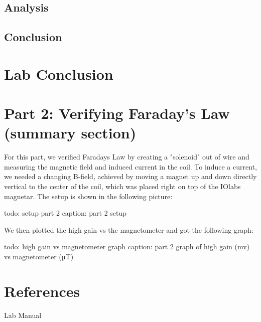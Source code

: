 \documentclass[11pt]{article}
\let\oldsection\section
\renewcommand\section{\clearpage\oldsection}
\begin{document}
    \subsection{Analysis}\label{subsec:part_3_analsysis}
    \subsection{Conclusion}\label{subsec:part_3_conclusion}

    \section{Lab Conclusion}\label{sec:lab_conclusion}


    

    \section{Part 2: Verifying Faraday’s Law (summary section)}\label{sec:part_2}

    For this part, we verified Faradays Law by creating a "solenoid" out of wire and measuring the magnetic field and induced current in the coil. To induce a current, we needed a changing B-field, achieved by moving a magnet up and down directly vertical to the center of the coil, which was placed right on top of the IOlabs magnetar. The setup is shown in the following picture:

    todo: setup part 2
    caption: part 2 setup

    We then plotted the high gain vs the magnetometer and got the following graph:

    todo: high gain vs magnetometer graph
    caption: part 2 graph of high gain (mv) vs magnetometer (µT)


    \appendix
    \section{References}\label{sec:references}

    Lab Manual
\end{document}
